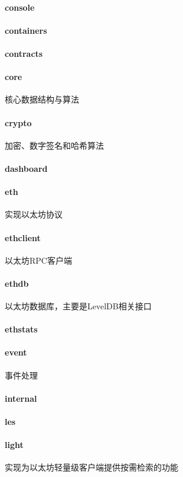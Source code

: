 \documentclass[UTF8]{ctexart}
\begin{document}
\paragraph{console}
\paragraph{containers}
\paragraph{contracts}
\paragraph{core} 核心数据结构与算法
\paragraph{crypto} 加密、数字签名和哈希算法
\paragraph{dashboard}
\paragraph{eth} 实现以太坊协议
\paragraph{ethclient} 以太坊RPC客户端
\paragraph{ethdb} 以太坊数据库，主要是LevelDB相关接口
\paragraph{ethstats}
\paragraph{event} 事件处理
\paragraph{internal}
\paragraph{les}
\paragraph{light} 实现为以太坊轻量级客户端提供按需检索的功能
\end{document}

